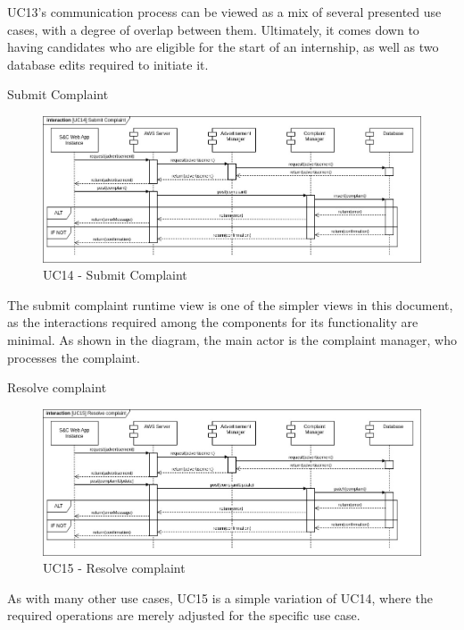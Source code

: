 \begin{enumerate}[label={[UC\arabic*]}]
    UC13's communication process can be viewed as a mix of several presented use cases, with a degree of overlap between them. Ultimately, it comes down to having candidates who are eligible for the start of an internship, as well as two database edits required to initiate it.
    
    \item Submit Complaint

    \begin{figure}[h]
        \centering
        \includegraphics[width=1\linewidth]{DD-Latex//assets//Runtime View Diagrams/UC14.jpg}
        \caption{UC14 - Submit Complaint}
        \label{fig:UC14}
    \end{figure}

    The submit complaint runtime view is one of the simpler views in this document, as the interactions required among the components for its functionality are minimal. As shown in the diagram, the main actor is the complaint manager, who processes the complaint.
    
    \item Resolve complaint

    \begin{figure}[h]
        \centering
        \includegraphics[width=1\linewidth]{DD-Latex//assets//Runtime View Diagrams/UC15.jpg}
        \caption{UC15 - Resolve complaint}
        \label{fig:UC15}
    \end{figure}

    As with many other use cases, UC15 is a simple variation of UC14, where the required operations are merely adjusted for the specific use case.
    

\end{enumerate}

